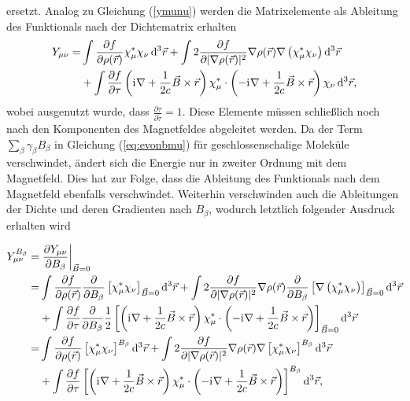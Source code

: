 ersetzt. Analog zu Gleichung (\ref{ymunu}) werden die Matrixelemente als Ableitung des Funktionals nach der Dichtematrix erhalten
\begin{equation}
\begin{aligned}
Y_{\mu\nu}=&\int\frac{\partial f}{\partial \rho(\vec{r})}\chi_\mu^*\chi_\nu\mathop{}\!\mathrm{d^3}\vec{r}
+\int 2\frac{\partial f}{\partial \vert\nabla \rho(\vec{r})\vert^2}\nabla \rho(\vec{r})\nabla \left(\chi_\mu^*\chi_\nu\right)\mathop{}\!\mathrm{d^3}\vec{r}\\
&+\int\frac{\partial f}{\partial\tau}\left(\mathrm{i}\mkern1mu\nabla +\frac{1}{2c}\vec{B}\times\vec{r}\right)\chi_\mu^*\cdot\left(-\mathrm{i}\mkern1mu\nabla+\frac{1}{2c}\vec{B}\times\vec{r}\right)\chi_\nu\mathop{}\!\mathrm{d^3}\vec{r},
\end{aligned}
\end{equation}
wobei ausgenutzt wurde, dass $\frac{\partial \tau}{\partial \tilde{\tau}}=1$. Diese Elemente müssen schließlich noch nach den Komponenten des Magnetfeldes abgeleitet werden. Da der Term $\sum_\beta \gamma_\beta B_\beta$ in Gleichung (\ref{eq:evonbmu}) für geschlossenschalige Moleküle verschwindet, ändert sich die Energie nur in zweiter Ordnung mit dem Magnetfeld. Dies hat zur Folge, dass die Ableitung des Funktionals nach dem Magnetfeld ebenfalls verschwindet. Weiterhin verschwinden auch die Ableitungen der Dichte und deren Gradienten nach $B_\beta$,\supercite{lee1995density} wodurch letztlich folgender Ausdruck erhalten wird\supercite{maximoff2004nuclear} 

\begin{equation}\label{eq:ymunudb}
\begin{aligned}
Y_{\mu\nu}^{B_\beta}=&\left.\frac{\partial Y_{\mu\nu}}{\partial B_\beta}\right\vert_{\vec{B}=0}\\
=&\int\frac{\partial f}{\partial \rho(\vec{r})}\frac{\partial}{\partial B_\beta}\left[\chi_\mu^*\chi_\nu\right]_{\vec{B}=0}\mathop{}\!\mathrm{d^3}\vec{r}
+\int 2\frac{\partial f}{\partial \vert\nabla \rho(\vec{r})\vert^2}\nabla \rho(\vec{r})\frac{\partial}{\partial B_\beta}\left[\nabla \left(\chi_\mu^*\chi_\nu\right)\right]_{\vec{B}=0}\mathop{}\!\mathrm{d^3}\vec{r}\\
&+\int\frac{\partial f}{\partial\tau}\frac{\partial}{\partial B_\beta}\frac{1}{2}\left[\left(\mathrm{i}\mkern1mu\nabla +\frac{1}{2c}\vec{B}\times\vec{r}\right)\chi_\mu^*\cdot\left(-\mathrm{i}\mkern1mu\nabla+\frac{1}{2c}\vec{B}\times\vec{r}\right)\right]_{\vec{B}=0}\mathop{}\!\mathrm{d^3}\vec{r}\\
=&\int\frac{\partial f}{\partial \rho(\vec{r})}\left[\chi_\mu^*\chi_\nu\right]^{B_\beta}\mathop{}\!\mathrm{d^3}\vec{r}
+\int 2\frac{\partial f}{\partial \vert\nabla \rho(\vec{r})\vert^2}\nabla \rho(\vec{r})\nabla \left[\chi_\mu^*\chi_\nu\right]^{B_\beta}\mathop{}\!\mathrm{d^3}\vec{r}\\
&+\int\frac{\partial f}{\partial\tau}\left[\left(\mathrm{i}\mkern1mu\nabla +\frac{1}{2c}\vec{B}\times\vec{r}\right)\chi_\mu^*\cdot\left(-\mathrm{i}\mkern1mu\nabla+\frac{1}{2c}\vec{B}\times\vec{r}\right)\right]
^{B_\beta}\mathop{}\!\mathrm{d^3}\vec{r},
\end{aligned}
\end{equation}

